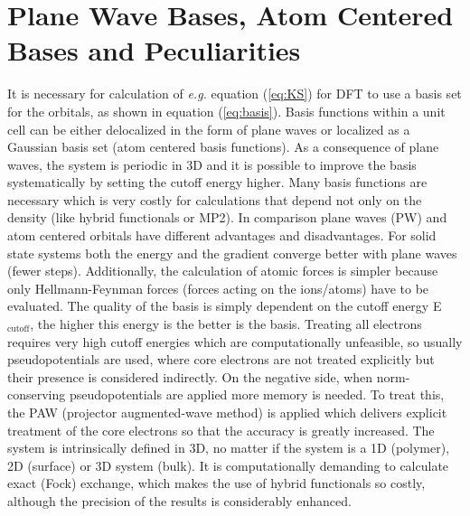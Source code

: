\documentclass[11pt,DIV=13,BCOR=5mm,a4paper,headinclude]{scrbook}
\begin{document}
\section{Plane Wave Bases, Atom Centered Bases and Peculiarities}
It is necessary for calculation of \textit{e.g.} equation (\ref{eq:KS}) for DFT to use a basis set for the orbitals, as shown in equation (\ref{eq:basis}).
Basis functions within a unit cell can be either delocalized in the form of plane waves or localized as a Gaussian basis set (atom centered basis functions).
As a consequence of plane waves, the system is periodic in 3D and it is possible to improve the basis systematically by setting the cutoff energy higher.
Many basis functions are necessary which is very costly for calculations that depend not only on the density (like hybrid functionals or MP2).
In comparison plane waves (PW) and atom centered orbitals have different advantages and disadvantages\cite{Tosoni2007}.
For solid state systems both the energy and the gradient converge better with plane waves (fewer steps).
Additionally, the calculation of atomic forces is simpler because only Hellmann-Feynman forces (forces acting on the ions/atoms) have to be evaluated.
The quality of the basis is simply dependent on the cutoff energy E$_\textrm{cutoff}$, the higher this energy is the better is the basis.
Treating all electrons requires very high cutoff energies  which are computationally unfeasible, so usually pseudopotentials are used, where core electrons are not treated explicitly but their presence is considered indirectly.
On the negative side, when norm-conserving pseudopotentials are applied more memory is needed.
To treat this, the PAW (projector augmented-wave method)\cite{paw1,Kresse1999} is applied which delivers explicit treatment of the core electrons so that the accuracy is greatly increased.
The system is intrinsically defined in 3D, no matter if the system is a 1D (polymer), 2D (surface) or 3D system (bulk).
It is computationally demanding to calculate exact (Fock) exchange, which makes the use of hybrid functionals so costly, although the precision of the results is considerably enhanced.
\\
\end{document}
